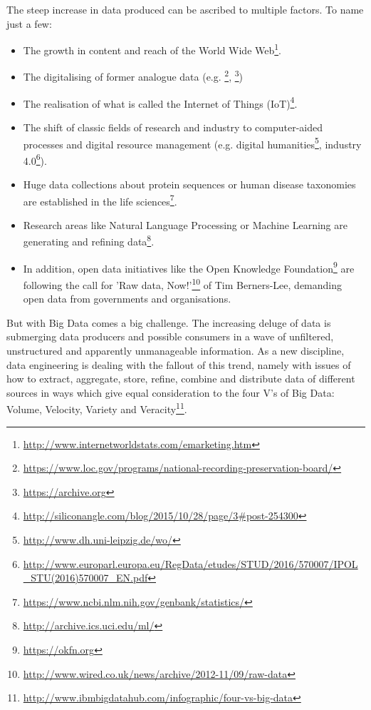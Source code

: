 \documentclass[a4paper,english,twoside,BCOR1.5cm,headsepline,DIV12,appendixprefix,final,12pt]{scrbook}
\newcommand\footnoteurl[1]{\footnote{\scriptsize\url{#1}}}
\begin{document}
The steep increase in data produced can be ascribed to multiple factors. To name just a few:
\begin{itemize}
\item The growth in content and reach of the World Wide Web\footnoteurl{http://www.internetworldstats.com/emarketing.htm}.
\item The digitalising of former analogue data (e.g. \footnoteurl{https://www.loc.gov/programs/national-recording-preservation-board/}, \footnoteurl{https://archive.org})
\item The realisation of what is called the Internet of Things (IoT)\footnoteurl{http://siliconangle.com/blog/2015/10/28/page/3\#post-254300}.
\item The shift of classic fields of research and industry to computer-aided processes and digital resource management (e.g. digital humanities\footnoteurl{http://www.dh.uni-leipzig.de/wo/}, industry 4.0\footnoteurl{http://www.europarl.europa.eu/RegData/etudes/STUD/2016/570007/IPOL_STU(2016)570007_EN.pdf}).
\item Huge data collections about protein sequences or human disease taxonomies are established in the life sciences\footnoteurl{https://www.ncbi.nlm.nih.gov/genbank/statistics/}.
\item Research areas like Natural Language Processing or Machine Learning are generating and refining data\footnoteurl{http://archive.ics.uci.edu/ml/}. 
\item In addition, open data initiatives like the Open Knowledge Foundation\footnoteurl{https://okfn.org} are following the call for 'Raw data, Now!'\footnoteurl{http://www.wired.co.uk/news/archive/2012-11/09/raw-data} of Tim Berners-Lee, demanding open data from governments and organisations.
\end{itemize} 

But with Big Data comes a big challenge. The increasing deluge of data is submerging data producers and possible consumers in a wave of unfiltered, unstructured and apparently unmanageable information. As a new discipline, data engineering is dealing with the fallout of this trend, namely with issues of how to extract, aggregate, store, refine, combine and distribute data of different sources in ways which give equal consideration to the four V's of Big Data: Volume, Velocity, Variety and Veracity\footnoteurl{http://www.ibmbigdatahub.com/infographic/four-vs-big-data}. 
\end{document}
